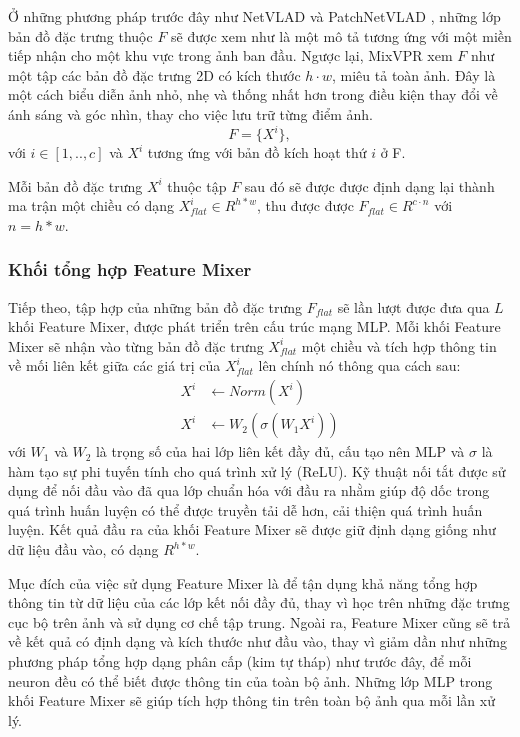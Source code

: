 Ở những phương pháp trước đây như NetVLAD \cite{arandjelovic2016netvlad} và PatchNetVLAD \cite{hausler2021patchnetvlad}, những lớp bản đồ đặc trưng thuộc $F$ sẽ được xem như là một mô tả tương ứng với một miền tiếp nhận cho một khu vực trong ảnh ban đầu. Ngược lại, MixVPR xem $F$ như một tập các bản đồ đặc trưng 2D có kích thước $h \cdot w$, miêu tả toàn ảnh. Đây là một cách biểu diễn ảnh nhỏ, nhẹ và thống nhất hơn trong điều kiện thay đổi về ánh sáng và góc nhìn, thay cho việc lưu trữ từng điểm ảnh.
$$
  F = \{X^{i}\},
$$
với $i \in \left[1,..,c\right]$ và $X^{i}$ tương ứng với bản đồ kích hoạt thứ $i$ ở F.

Mỗi bản đồ đặc trưng $X^{i}$ thuộc tập $F$ sau đó sẽ được được định dạng lại thành ma trận một chiều có dạng $X_{flat}^{i} \in R^{h*w}$, thu được được $F_{flat} \in R^{c \cdot n}$ với $n = h*w$.

\subsubsection{Khối tổng hợp Feature Mixer}
Tiếp theo, tập hợp của những bản đồ đặc trưng $F_{flat}$ sẽ lần lượt được đưa qua $L$ khối Feature Mixer, được phát triển trên cấu trúc mạng MLP. Mỗi khối Feature Mixer sẽ nhận vào từng bản đồ đặc trưng $X_{flat}^{i}$ một chiều và tích hợp thông tin về mối liên kết giữa các giá trị của $X_{flat}^{i}$ lên chính nó thông qua cách sau:
$$
  \begin{aligned}
    X^{i} & \leftarrow Norm(X^{i})            \\
    X^{i} & \leftarrow W_2(\sigma(W_1 X^{i}))
  \end{aligned}
$$
với $W_1$ và $W_2$ là trọng số của hai lớp liên kết đầy đủ, cấu tạo nên MLP và $\sigma$ là hàm tạo sự phi tuyến tính cho quá trình xử lý (ReLU). Kỹ thuật nối tắt được sử dụng để nối đầu vào đã qua lớp chuẩn hóa với đầu ra nhằm giúp độ dốc trong quá trình huấn luyện có thể được truyền tải dễ hơn, cải thiện quá trình huấn luyện. Kết quả đầu ra của khối Feature Mixer sẽ được giữ định dạng giống như dữ liệu đầu vào, có dạng $R^{h*w}$. 

Mục đích của việc sử dụng Feature Mixer là để tận dụng khả năng tổng hợp thông tin từ dữ liệu của các lớp kết nối đầy đủ, thay vì học trên những đặc trưng cục bộ trên ảnh và sử dụng cơ chế tập trung. Ngoài ra, Feature Mixer cũng sẽ trả về kết quả có định dạng và kích thước như đầu vào, thay vì giảm dần như những phương pháp tổng hợp dạng phân cấp (kim tự tháp) như trước đây, để mỗi neuron đều có thể biết được thông tin của toàn bộ ảnh. Những lớp MLP trong khối Feature Mixer sẽ giúp tích hợp thông tin trên toàn bộ ảnh qua mỗi lần xử lý.


